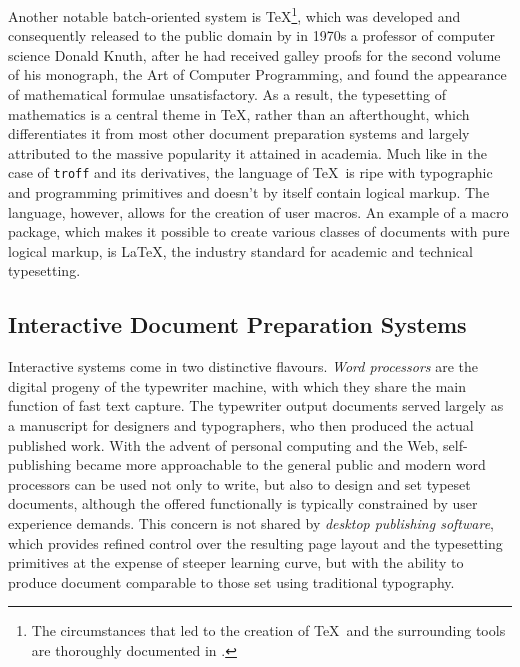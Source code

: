 \documentclass{book}
\begin{document}

        Another notable batch-oriented system is \TeX\footnote{
          The circumstances that led to the creation of \TeX\ and the
          surrounding tools are thoroughly documented in \cite{knuth98}.
        }, which was developed and consequently released to the public domain by
        in 1970s a professor of computer science Donald Knuth, after he had
        received galley proofs for the second volume of his monograph, the Art
        of Computer Programming, and found the appearance of mathematical
        formulae unsatisfactory. As a result, the typesetting of mathematics is
        a central theme in \TeX, rather than an afterthought, which
        differentiates it from most other document preparation systems and
        largely attributed to the massive popularity it attained in academia.
        Much like in the case of \texttt{troff} and its derivatives, the
        language of \TeX\ is ripe with typographic and programming primitives
        and doesn't by itself contain logical markup. The language, however,
        allows for the creation of user macros. An example of a macro package,
        which makes it possible to create various classes of documents with pure
        logical markup, is \LaTeX, the industry standard for academic and
        technical typesetting.
        

      \subsection{Interactive Document Preparation Systems}
        Interactive systems come in two distinctive flavours. \emph{Word
        processors} are the digital progeny of the typewriter machine, with
        which they share the main function of fast text capture. The typewriter
        output documents served largely as a manuscript for designers and
        typographers, who then produced the actual published work. With the
        advent of personal computing and the Web, self-publishing became more
        approachable to the general public and modern word processors can be
        used not only to write, but also to design and set typeset documents,
        although the offered functionally is typically constrained by user
        experience demands. This concern is not shared by \emph{desktop
        publishing software}, which provides refined control over the resulting page
        layout and the typesetting primitives at the expense of steeper learning
        curve, but with the ability to produce document comparable to those set
        using traditional typography.
\end{document}

